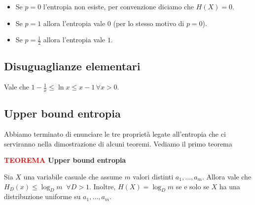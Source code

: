 \documentclass[12pt]{report}
\begin{document}
    \begin{itemize}
        \item Se $p = 0$ l'entropia non esiste, per convenzione diciamo che $H(X) = 0$.
        \item Se $p = 1$ allora l'entropia vale $0$ (per lo stesso motivo di $p = 0$).
        \item Se $p = \frac{1}{2}$ allora l'entropia vale $1$.
    \end{itemize}

    \subsection{Disuguaglianze elementari}

    Vale che $1-\frac{1}{x} \leq \ln{x} \leq x-1\, \forall x > 0$.

    \vspace{10px}


    \subsection{Upper bound entropia}

    Abbiamo terminato di enunciare le tre proprietà legate all'entropia che ci serviranno nella dimostrazione di alcuni teoremi.
    Vediamo il primo teorema

    \vspace{5px}
    \begin{tcolorbox}
        \textbf{\textcolor{red}{TEOREMA} Upper bound entropia }
        \vspace{5px}
        \begin{center}
            Sia $X$ una variabile casuale che assume $m$ valori distinti $a_1,\dots,a_m$. Allora vale che $H_D(x) \leq \log_D{m} \; \; \forall D > 1$. Inoltre, $H(X) = \log_D{m}$ se e solo se $X$ ha una distribuzione uniforme su $a_1,\dots,a_m$.
        \end{center}
    \end{tcolorbox}
\end{document}
